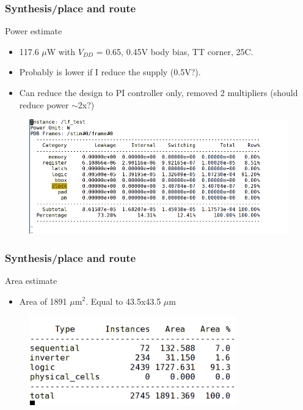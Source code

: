 \documentclass[t, screen, aspectratio=43]{beamer}
\begin{document}
\begin{frame}
	\frametitle{Synthesis/place and route}
	\begin{block}{Power estimate}
	\tiny
	\begin{itemize}[itemsep=4pt,label=\protect---]
		\item 117.6 $\mu$W with $V_{DD}$ = 0.65, 0.45V body bias, TT corner, 25C.
		\item Probably is lower if I reduce the supply (0.5V?). 
		\item Can reduce the design to PI controller only, removed 2 multipliers (should reduce power $\sim$2x?)
	\end{itemize}
	\vspace{-1em}
	\begin{figure}[htb!]
	        \centering
	        \includegraphics[width=1\textwidth, angle=0]{lf_power}
	\end{figure}

	\end{block}	
\end{frame}


\begin{frame}
	\frametitle{Synthesis/place and route}
	\begin{block}{Area estimate}
	\tiny
	\begin{itemize}[itemsep=4pt,label=\protect---]
		\item Area of 1891 $\mu$m$^2$. Equal to 43.5x43.5 $\mu$m
	\end{itemize}
	\vspace{-1em}
	\begin{figure}[htb!]
	        \centering
	        \includegraphics[width=0.8\textwidth, angle=0]{lf_area}
	\end{figure}

	\end{block}	
\end{frame}
\end{document}
